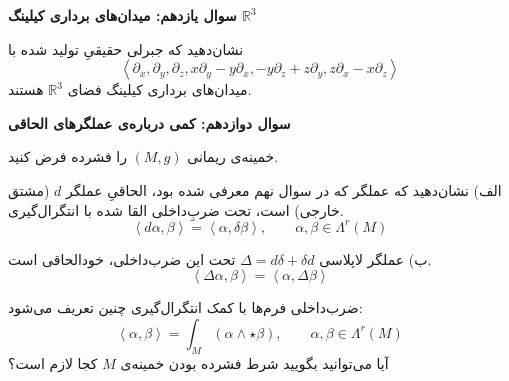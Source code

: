\documentclass[a4paper, 12pt]{article}
\newenvironment{parind}{%
	\par%
	\medskip
	\leftskip=0mm\rightskip=7mm
	\noindent\ignorespaces}{%
	\par\medskip}
\begin{document}
\newpage
\textbf{سوال یازدهم:
	میدان‌های برداری کیلینگ 
	$\mathbb{R}^3$
}

\vspace{0.7em}
نشان‌دهید که 
جبر‌لی حقیقیِ تولید شده با
\[
\left<\partial_x , \partial_y , \partial_z , x\partial_y - y\partial_x, -y\partial_z + z\partial_y , z\partial_x - x\partial_z \right>
\]
میدان‌های برداری کیلینگ فضای 
$\mathbb{R}^3$
هستند.



\newpage
\textbf{سوال دوازدهم:
	کمی درباره‌ی عملگر‌های الحاقی
}

\vspace{0.7em}
خمینه‌ی ریمانی 
$(M,g)$
را فشرده فرض کنید.

\begin{parind}
	الف) نشان‌دهید که عملگر 
	که در سوال نهم معرفی شده بود، الحاقیِ 
	عملگر $d$ (مشتق خارجی) است، تحت ضرب‌ِداخلی القا شده با انتگرال‌گیری.
	\[
	\left< d\alpha,\beta \right> = 
	\left< \alpha , \delta \beta \right> , \qquad \alpha,\beta \in \Lambda^r(M)
	\]
	
	ب) عملگر لاپلاسی 
	$\Delta = d\delta +\delta d$
	تحت این ضرب‌داخلی، خودالحاقی
	 است.
	\[
	\left< \Delta\alpha,\beta \right> = 
	\left< \alpha , \Delta \beta \right>
	\]

\end{parind}
\begin{mdframed}
	ضرب‌داخلی فرم‌ها با کمک انتگرال‌گیری چنین تعریف می‌شود:
	\[
	\left< \alpha,\beta \right> = \int_M (\alpha \wedge \star \beta) , \qquad \alpha,\beta \in \Lambda^r(M)
	\]
	آیا می‌توانید بگویید شرط فشرده بودن خمینه‌ی $M$ کجا لازم است؟
\end{mdframed}
\end{document}
